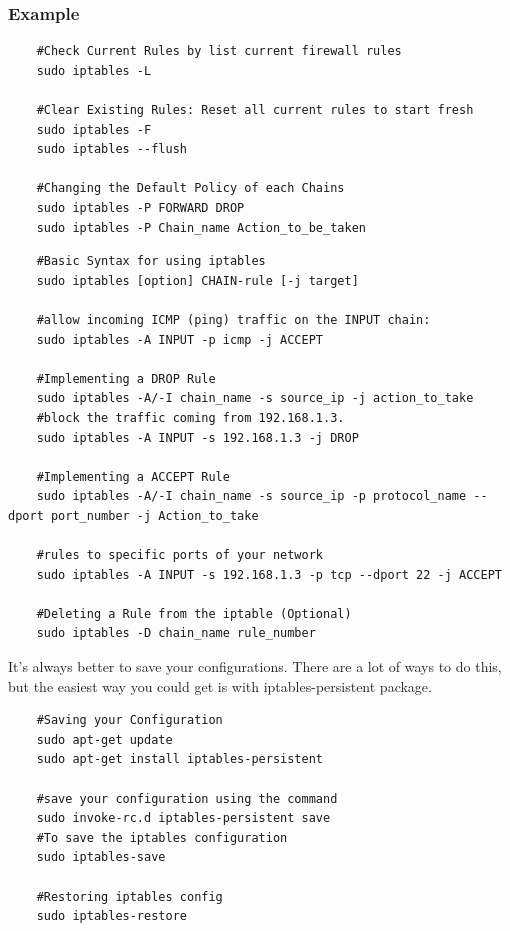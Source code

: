\subsubsection{Example}
\begin{lstlisting} 
    #Check Current Rules by list current firewall rules
    sudo iptables -L 

    #Clear Existing Rules: Reset all current rules to start fresh
    sudo iptables -F 
    sudo iptables --flush

    #Changing the Default Policy of each Chains
    sudo iptables -P FORWARD DROP 
    sudo iptables -P Chain_name Action_to_be_taken
\end{lstlisting} 
\begin{lstlisting} 
    #Basic Syntax for using iptables
    sudo iptables [option] CHAIN-rule [-j target] 

    #allow incoming ICMP (ping) traffic on the INPUT chain:
    sudo iptables -A INPUT -p icmp -j ACCEPT

    #Implementing a DROP Rule 
    sudo iptables -A/-I chain_name -s source_ip -j action_to_take
    #block the traffic coming from 192.168.1.3.
    sudo iptables -A INPUT -s 192.168.1.3 -j DROP
    
    #Implementing a ACCEPT Rule
    sudo iptables -A/-I chain_name -s source_ip -p protocol_name --dport port_number -j Action_to_take

    #rules to specific ports of your network
    sudo iptables -A INPUT -s 192.168.1.3 -p tcp --dport 22 -j ACCEPT
    
    #Deleting a Rule from the iptable (Optional)
    sudo iptables -D chain_name rule_number 
\end{lstlisting} 
\vspace{3ex} 
It's always better to save your configurations. There are a lot of ways to do this, but the easiest way 
you could get is with iptables-persistent package.
\begin{lstlisting} 
    #Saving your Configuration 
    sudo apt-get update
    sudo apt-get install iptables-persistent
    
    #save your configuration using the command
    sudo invoke-rc.d iptables-persistent save 
    #To save the iptables configuration
    sudo iptables-save

    #Restoring iptables config 
    sudo iptables-restore
\end{lstlisting} 

